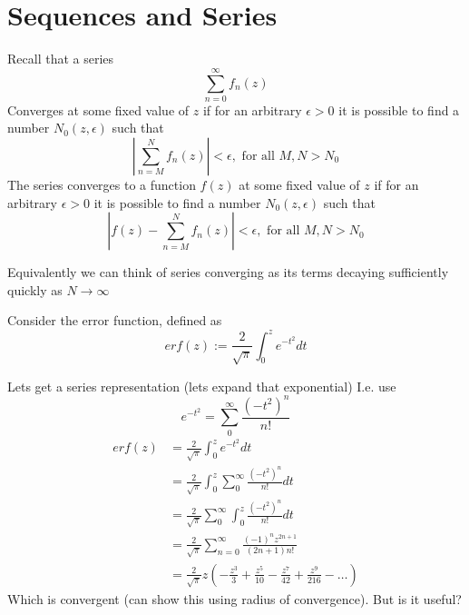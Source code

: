 \documentclass{X:/Documents/Coding/Latex/myassignment}
\begin{document}
\section{Sequences and Series}
Recall that a series
\[\sum_{n=0}^\infty f_n(z)\]
Converges at some fixed value of $z$ if for an arbitrary $\epsilon >0$ it is possible to find a number $N_0(z,\epsilon)$ such that
\[\left|\sum_{n=M}^N f_n(z)\right| < \epsilon, \text{ for all }M,N>N_0\]
The series converges to a function $f(z)$ at some fixed value of $z$ if for an arbitrary $\epsilon >0$ it is possible to find a number $N_0(z,\epsilon)$ such that
\[\left|f(z) - \sum_{n=M}^N f_n(z)\right| < \epsilon, \text{ for all }M,N>N_0\]

Equivalently we can think of series converging as its terms decaying sufficiently quickly as $N\to \infty$


Consider the error function, defined as
\[erf(z) := \frac2{\sqrt{\pi}} \int_0^z e^{-t^2}dt\]

Lets get a series representation (lets expand that exponential)
I.e. use
\[e^{-t^2} = \sum_{0}^\infty \frac{(-t^2)^n}{n!}\]
\begin{align*}
    erf(z) &= \frac{2}{\sqrt{\pi}} \int_0^z e^{-t^2}dt\\
    &=\frac{2}{\sqrt{\pi}} \int_0^z \sum_{0}^\infty \frac{(-t^2)^n}{n!} dt\\
    &=\frac{2}{\sqrt{\pi}}  \sum_{0}^\infty \int_0^z\frac{(-t^2)^n}{n!} dt\\
    &= \frac2{\sqrt{\pi}} \sum_{n=0}^\infty \frac{(-1)^n z^{2n+1}}{(2n+1)n!}\\
    &= \frac2{\sqrt{\pi}}z( - \frac{z^3}{3} + \frac{z^5}{10} - \frac{z^7}{42} + \frac{z^9}{216} - \hdots )
\end{align*}
Which is convergent (can show this using radius of convergence). But is it useful?
\end{document}
